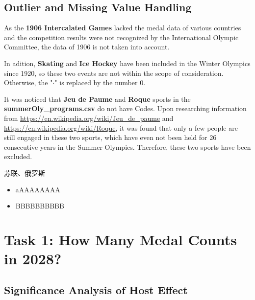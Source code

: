 \documentclass{mcmthesis}
\begin{document}
	\subsection{Outlier and Missing Value Handling}
	As the \textbf{1906 Intercalated Games} lacked the medal data of various countries and the competition results were not recognized by the International Olympic Committee, the data of 1906 is not taken into account.
	
	In adition, \textbf{Skating} and \textbf{Ice Hockey} have been included in the Winter Olympics since 1920, so these two events are not within the scope of consideration. Otherwise, the "$\cdot$" is replaced by the number $0$. 
	
	It was noticed that \textbf{Jeu de Paume} and \textbf{Roque} sports in the {\bf summerOly\_programs.csv} do not have Codes. Upon researching information from {\color{blue}\url{https://en.wikipedia.org/wiki/Jeu_de_paume}} and {\color{blue}\url{https://en.wikipedia.org/wiki/Roque}}, it was found that only a few people are still engaged in these two sports, which have even not been held for 26 consecutive years in the Summer Olympics. Therefore, these two sports have been excluded.
	
	
	苏联、俄罗斯
	
	
	
	
	
\begin{itemize}[leftmargin=0.15in, labelsep=0.1in, itemsep=1pt, parsep=0pt]
	\item aAAAAAAAA
	\item BBBBBBBBBB
\end{itemize}


	
	
	
	
	
	
	\section{Task 1: How Many Medal Counts in 2028? }
	
	\subsection{Significance Analysis of Host Effect}
	
\end{document}
